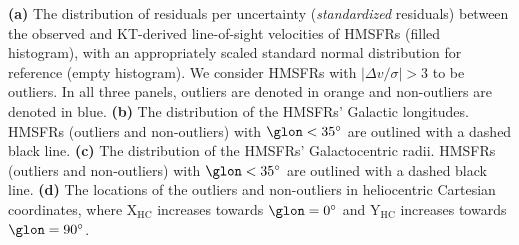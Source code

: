 \label{fig:outliers}
\textbf{(a)} The distribution of residuals per uncertainty (\textit{standardized} residuals) between the observed and KT-derived line-of-sight velocities of HMSFRs (filled histogram), with an appropriately scaled standard normal distribution for reference (empty histogram). We consider HMSFRs with $\vert \Delta v / \sigma \vert > 3$ to be outliers. In all three panels, outliers are denoted in orange and non-outliers are denoted in blue. 
\textbf{(b)} The distribution of the HMSFRs' Galactic longitudes. HMSFRs (outliers and non-outliers) with $\glon < 35^\circ$ are outlined with a dashed black line.
\textbf{(c)} The distribution of the HMSFRs' Galactocentric radii. HMSFRs (outliers and non-outliers) with $\glon < 35^\circ$ are outlined with a dashed black line.
\textbf{(d)} The locations of the outliers and non-outliers in heliocentric Cartesian coordinates, where $\mathrm{X_{HC}}$ increases towards $\glon=0^\circ$ and $\mathrm{Y_{HC}}$ increases towards $\glon=90^\circ$. 
